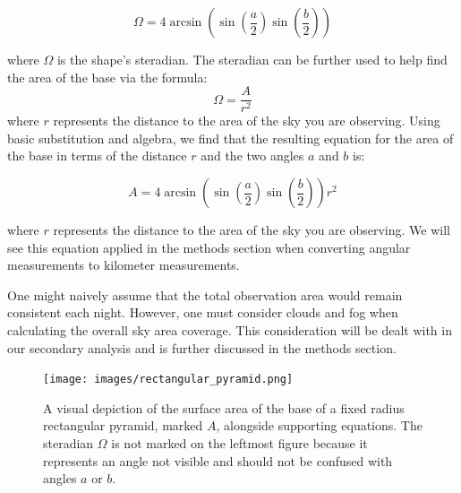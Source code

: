 \begin{equation}
\Omega =  4 \arcsin{(\sin{(\frac{a}{2})}\sin{(\frac{b}{2})})}
\label{steradian1}
\end{equation}

where $\Omega$ is the shape's steradian.  
The steradian can be further used to help find the area of the base via the formula:
\begin{equation}
\Omega = \frac{A}{r^2}
\label{steradian1}
\end{equation}
where $r$ represents the distance to the area of the sky you are observing.
Using basic substitution and algebra, we find that the resulting equation for the area of the base in terms of the distance $r$ and the two angles $a$ and $b$ is:

\begin{equation}
A =  4 \arcsin{(\sin{(\frac{a}{2})}\sin{(\frac{b}{2})})} r^2
\label{small_area_eq}
\end{equation}

where $r$ represents the distance to the area of the sky you are observing.
We will see this equation applied in the methods section when converting angular measurements to kilometer measurements.

One might naively assume that the total observation area would remain consistent each night.
However, one must consider clouds and fog when calculating the overall sky area coverage.
This consideration will be dealt with in our secondary analysis and is further discussed in the methods section.


\begin{figure}[ht!]
  \centering
  \texttt{[image: images/rectangular\_pyramid.png]}
  \caption[A visual depiction of the surface area of the base of a fixed radius rectangular pyramid, marked $A$, alongside supporting equations.]{A visual depiction of the surface area of the base of a fixed radius rectangular pyramid, marked $A$, alongside supporting equations.  The steradian $\Omega$ is not marked on the leftmost figure because it represents an angle not visible and should not be confused with angles $a$ or $b$.}
  \label{useful_area_equation}
\end{figure}


